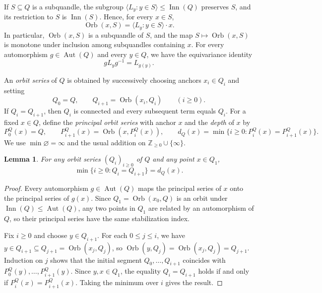\documentclass[11pt,a4paper]{article}
\newtheorem{lemma}[theorem]{Lemma}
\theoremstyle{remark}
\newcommand{\Inn}{\operatorname{Inn}}
\newcommand{\Orb}{\operatorname{Orb}}
\newcommand{\Aut}{\operatorname{Aut}}
\newcommand{\Z}{\mathbb{Z}}
\begin{document}
If \(S\subseteq Q\) is a subquandle, the subgroup
\(\langle L_y : y\in S\rangle\le\Inn(Q)\) preserves \(S\), and its
restriction to \(S\) is \(\Inn(S)\). Hence, for every \(x\in S\),
\begin{equation}\label{eq:ambient-orbit}
  \Orb(x,S)=\langle L_y : y\in S\rangle\cdot x.
\end{equation}
In particular, \(\Orb(x,S)\) is a subquandle of \(S\), and the map
\(S\mapsto\Orb(x,S)\) is monotone under inclusion among subquandles
containing \(x\). For every automorphism \(g\in\Aut(Q)\) and
every \(y\in Q\), we have the equivariance identity
\begin{equation}\label{eq:equivariance}
  gL_yg^{-1}=L_{g(y)}.
\end{equation}

An \emph{orbit series} of \(Q\) is obtained by successively choosing
anchors \(x_i\in Q_i\) and setting
\[
  Q_0=Q,\qquad Q_{i+1}=\Orb(x_i,Q_i)\qquad(i\ge 0).
\]
If \(Q_i=Q_{i+1}\), then \(Q_i\) is connected and every subsequent term
equals \(Q_i\). For a fixed \(x\in Q\), define the \emph{principal orbit
series} with anchor \(x\) and the \emph{depth} of \(x\) by
\[
  P_0^Q(x)=Q,\qquad P_{i+1}^Q(x)=\Orb(x,P_i^Q(x)),\qquad
  d_Q(x)=\min\{i\ge 0 : P_i^Q(x)=P_{i+1}^Q(x)\}.
\]
We use \(\min\varnothing=\infty\) and the usual addition on
\(\Z_{\ge 0}\cup\{\infty\}\).

\begin{lemma}\label{lem:principal}
For any orbit series \((Q_i)_{i\ge 0}\) of \(Q\) and any point
\(x\in Q_1\),
\[
  \min\{i\ge 0 : Q_i=Q_{i+1}\}=d_Q(x).
\]
\end{lemma}

\begin{proof}
Every automorphism \(g\in\Aut(Q)\) maps the principal series of \(x\)
onto the principal series of \(g(x)\). Since \(Q_1=\Orb(x_0,Q)\) is
an orbit under \(\Inn(Q)\le\Aut(Q)\), any two points in \(Q_1\) are
related by an automorphism of \(Q\), so their principal series have
the same stabilization index.

Fix \(i\ge 0\) and choose \(y\in Q_{i+1}\). For each \(0\le j\le i\),
we have \(y\in Q_{i+1}\subseteq Q_{j+1}=\Orb(x_j,Q_j)\), so
\(\Orb(y,Q_j)=\Orb(x_j,Q_j)=Q_{j+1}\). Induction on \(j\) shows that
the initial segment \(Q_0,\dots,Q_{i+1}\) coincides with
\(P_0^Q(y),\dots,P_{i+1}^Q(y)\). Since \(y,x\in Q_1\), the equality
\(Q_i=Q_{i+1}\) holds if and only if \(P_i^Q(x)=P_{i+1}^Q(x)\).
Taking the minimum over \(i\) gives the result.
\end{proof}
\end{document}
